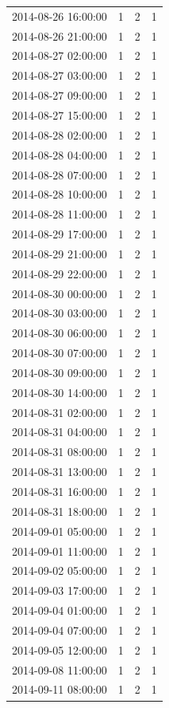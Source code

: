 \begin{tabular}{lrrr}
2014-08-26 16:00:00 & 1 & 2 & 1 \\
2014-08-26 21:00:00 & 1 & 2 & 1 \\
2014-08-27 02:00:00 & 1 & 2 & 1 \\
2014-08-27 03:00:00 & 1 & 2 & 1 \\
2014-08-27 09:00:00 & 1 & 2 & 1 \\
2014-08-27 15:00:00 & 1 & 2 & 1 \\
2014-08-28 02:00:00 & 1 & 2 & 1 \\
2014-08-28 04:00:00 & 1 & 2 & 1 \\
2014-08-28 07:00:00 & 1 & 2 & 1 \\
2014-08-28 10:00:00 & 1 & 2 & 1 \\
2014-08-28 11:00:00 & 1 & 2 & 1 \\
2014-08-29 17:00:00 & 1 & 2 & 1 \\
2014-08-29 21:00:00 & 1 & 2 & 1 \\
2014-08-29 22:00:00 & 1 & 2 & 1 \\
2014-08-30 00:00:00 & 1 & 2 & 1 \\
2014-08-30 03:00:00 & 1 & 2 & 1 \\
2014-08-30 06:00:00 & 1 & 2 & 1 \\
2014-08-30 07:00:00 & 1 & 2 & 1 \\
2014-08-30 09:00:00 & 1 & 2 & 1 \\
2014-08-30 14:00:00 & 1 & 2 & 1 \\
2014-08-31 02:00:00 & 1 & 2 & 1 \\
2014-08-31 04:00:00 & 1 & 2 & 1 \\
2014-08-31 08:00:00 & 1 & 2 & 1 \\
2014-08-31 13:00:00 & 1 & 2 & 1 \\
2014-08-31 16:00:00 & 1 & 2 & 1 \\
2014-08-31 18:00:00 & 1 & 2 & 1 \\
2014-09-01 05:00:00 & 1 & 2 & 1 \\
2014-09-01 11:00:00 & 1 & 2 & 1 \\
2014-09-02 05:00:00 & 1 & 2 & 1 \\
2014-09-03 17:00:00 & 1 & 2 & 1 \\
2014-09-04 01:00:00 & 1 & 2 & 1 \\
2014-09-04 07:00:00 & 1 & 2 & 1 \\
2014-09-05 12:00:00 & 1 & 2 & 1 \\
2014-09-08 11:00:00 & 1 & 2 & 1 \\
2014-09-11 08:00:00 & 1 & 2 & 1 \\

\end{tabular}
